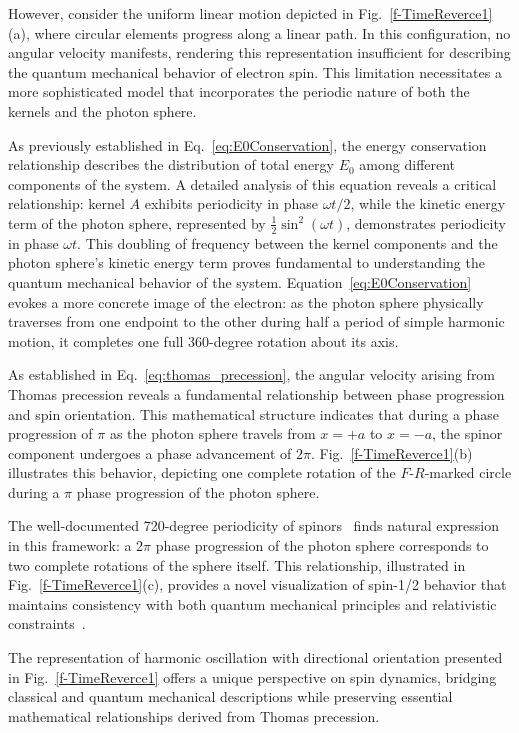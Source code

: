 \documentclass[%
 reprint,
 amsmath,amssymb,
 aps,
]{revtex4-1}
\numberwithin{equation}{section}%
\begin{document}
However, consider the uniform linear motion depicted in Fig.~\ref{f-TimeReverce1}(a), where circular elements progress along a linear path. In this configuration, no angular velocity manifests, rendering this representation insufficient for describing the quantum mechanical behavior of electron spin. This limitation necessitates a more sophisticated model that incorporates the periodic nature of both the kernels and the photon sphere.

As previously established in Eq.~\ref{eq:E0Conservation}, the energy conservation relationship describes the distribution of total energy $E_0$ among different components of the system. A detailed analysis of this equation reveals a critical relationship: kernel $A$ exhibits periodicity in phase $\omega t/2$, while the kinetic energy term of the photon sphere, represented by $\frac{1}{2}\sin^2(\omega t)$, demonstrates periodicity in phase $\omega t$. This doubling of frequency between the kernel components and the photon sphere's kinetic energy term proves fundamental to understanding the quantum mechanical behavior of the system. Equation~\ref{eq:E0Conservation} evokes a more concrete image of the electron: as the photon sphere physically traverses from one endpoint to the other during half a period of simple harmonic motion, it completes one full 360-degree rotation about its axis.

As established in Eq.~\ref{eq:thomas_precession}, the angular velocity arising from Thomas precession reveals a fundamental relationship between phase progression and spin orientation. This mathematical structure indicates that during a phase progression of $\pi$ as the photon sphere travels from $x=+a$ to $x=-a$, the spinor component undergoes a phase advancement of $2\pi$. Fig.~\ref{f-TimeReverce1}(b) illustrates this behavior, depicting one complete rotation of the $F$-$R$-marked circle during a $\pi$ phase progression of the photon sphere.

The well-documented 720-degree periodicity of spinors~\cite{Hestenes1990} finds natural expression in this framework: a $2\pi$ phase progression of the photon sphere corresponds to two complete rotations of the sphere itself. This relationship, illustrated in Fig.~\ref{f-TimeReverce1}(c), provides a novel visualization of spin-1/2 behavior that maintains consistency with both quantum mechanical principles and relativistic constraints~\cite{Dirac1928}.

The representation of harmonic oscillation with directional orientation presented in Fig.~\ref{f-TimeReverce1} offers a unique perspective on spin dynamics, bridging classical and quantum mechanical descriptions while preserving essential mathematical relationships derived from Thomas precession.
\end{document}
